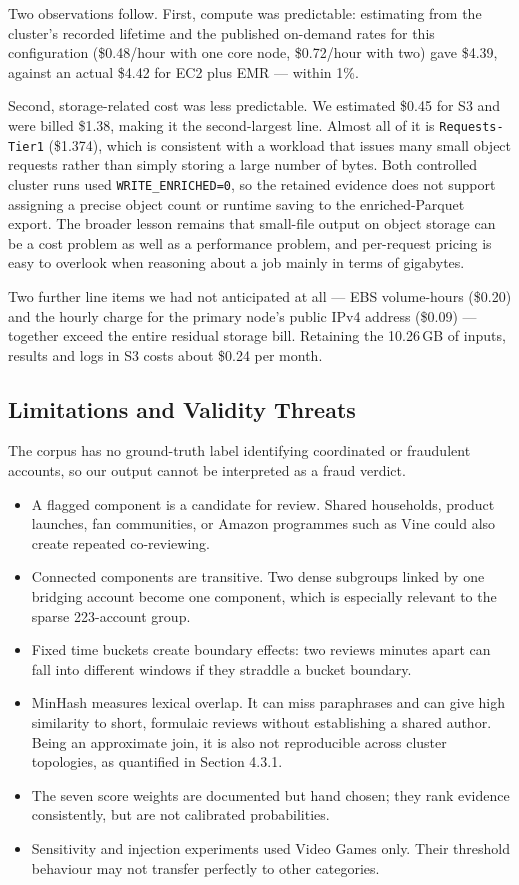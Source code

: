 \documentclass[12pt]{article}
\begin{document}
Two observations follow. First, compute was predictable: estimating from the
cluster's recorded lifetime and the published on-demand rates for this
configuration (\$0.48/hour with one core node, \$0.72/hour with two) gave
\$4.39, against an actual \$4.42 for EC2 plus EMR --- within 1\%.

Second, storage-related cost was less predictable. We estimated \$0.45 for S3
and were billed \$1.38, making it the second-largest line. Almost all of it is
\texttt{Requests-Tier1} (\$1.374), which is consistent with a workload that
issues many small object requests rather than simply storing a large number of
bytes. Both controlled cluster runs used \texttt{WRITE\_ENRICHED=0}, so the
retained evidence does not support assigning a precise object count or runtime
saving to the enriched-Parquet export. The broader lesson remains that
small-file output on object storage can be a cost problem as well as a
performance problem, and per-request pricing is easy to overlook when
reasoning about a job mainly in terms of gigabytes.

Two further line items we had not anticipated at all --- EBS volume-hours
(\$0.20) and the hourly charge for the primary node's public IPv4 address
(\$0.09) --- together exceed the entire residual storage bill. Retaining the
10.26\,GB of inputs, results and logs in S3 costs about \$0.24 per month.

\subsection{Limitations and Validity Threats}

The corpus has no ground-truth label identifying coordinated or fraudulent
accounts, so our output cannot be interpreted as a fraud verdict.
\begin{itemize}
  \item A flagged component is a candidate for review. Shared households,
        product launches, fan communities, or Amazon programmes such as Vine
        could also create repeated co-reviewing.
  \item Connected components are transitive. Two dense subgroups linked by one
        bridging account become one component, which is especially relevant to
        the sparse 223-account group.
  \item Fixed time buckets create boundary effects: two reviews minutes apart
        can fall into different windows if they straddle a bucket boundary.
  \item MinHash measures lexical overlap. It can miss paraphrases and can give
        high similarity to short, formulaic reviews without establishing a
        shared author. Being an approximate join, it is also not reproducible
        across cluster topologies, as quantified in Section 4.3.1.
  \item The seven score weights are documented but hand chosen; they rank
        evidence consistently, but are not calibrated probabilities.
  \item Sensitivity and injection experiments used Video Games only. Their
        threshold behaviour may not transfer perfectly to other categories.
\end{itemize}
\end{document}
